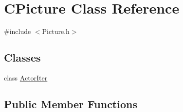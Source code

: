 \hypertarget{class_c_picture}{\section{C\+Picture Class Reference}
\label{class_c_picture}
}


{\ttfamily \#include $<$Picture.\+h$>$}

\subsection*{Classes}
\begin{DoxyCompactItemize}
\item 
class \hyperlink{class_c_picture_1_1_actor_iter}{Actor\+Iter}
\end{DoxyCompactItemize}
\subsection*{Public Member Functions}
